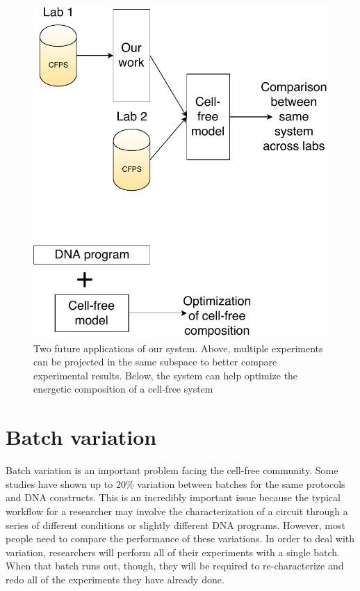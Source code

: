 \begin{figure}[t!]
\begin{center}
\includegraphics{figs/Applications.pdf}
\caption{Two future applications of our system.
Above, multiple experiments can be projected in the same subspace to better compare experimental results.
Below, the system can help optimize the energetic composition of a cell-free system}
\end{center}
\label{fig:apps}
\end{figure}

\section{Batch variation}
Batch variation is an important problem facing the cell-free community.
Some studies have shown up to 20\% variation between batches for the same protocols and DNA constructs.
This is an incredibly important issue because the typical workflow for a researcher may involve the characterization of a circuit through a series of different conditions or slightly different DNA programs.
However, most people need to compare the performance of these variations.
In order to deal with variation, researchers will perform all of their experiments with a single batch.
When that batch runs out, though, they will be required to re-characterize and redo all of the experiments they have already done.

